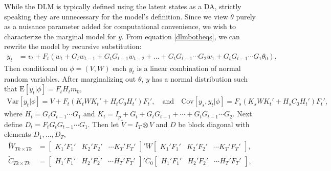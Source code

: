 \documentclass[12pt]{article}
\begin{document}
While the DLM is typically defined using the latent states as a DA, strictly speaking they are unnecessary for the model's definition. Since we view $\theta$ purely as a nuisance parameter added for computational convenience, we wish to characterize the marginal model for $y$. From equation \eqref{dlmbotheqs}, we can rewrite the model by recursive substitution:
\begin{align*}
  y_t &= v_t + F_t\left(w_t + G_tw_{t-1} + G_tG_{t-1}w_{t-2} + ... + G_tG_{t-1}\cdots G_{2}w_1 + G_tG_{t-1}\cdots G_1\theta_0\right).
\end{align*}
Then conditional on $\phi=(V,W)$ each $y_t$ is a linear combination of normal random variables. After marginalizing out $\theta$, $y$ has a normal distribution such that $\mathrm{E}[y_t|\phi] =  F_tH_tm_0$,
\begin{align*}
  \mathrm{Var}[y_t|\phi] =  V + F_t(K_tWK_t' + H_tC_0H_t')F_t' ,\quad \mathrm{and} \quad
  \mathrm{Cov}[y_s,y_t|\phi] = F_s(K_sWK_t' + H_sC_0H_t')F_t',
\end{align*}
where $H_t = G_tG_{t-1}\cdots G_1$ and $K_t = I_p + G_t + G_tG_{t-1} + \cdots + G_tG_{t-1}\cdots G_2$. Next define $D_t = F_tG_tG_{t-1}\cdots G_1$. Then let $\tilde{V}=I_T\otimes V$ and $D$ be block diagonal with elements $D_1,\ldots,D_T$, 
\begin{align*}
\tilde{W}_{Tk\times Tk} &= \begin{bmatrix} K_1'F_1' & K_2'F_2' & \cdots K_T'F_T' \end{bmatrix}' W \begin{bmatrix} K_1'F_1' & K_2'F_2' & \cdots K_T'F_T' \end{bmatrix}, &\\
\tilde{C}_{Tk\times Tk} &= \begin{bmatrix} H_1'F_1' & H_2'F_2' & \cdots H_T'F_T' \end{bmatrix}' C_0 \begin{bmatrix} H_1'F_1' & H_2'F_2' & \cdots H_T'F_T' \end{bmatrix},&
\end{align*}
\end{document}
